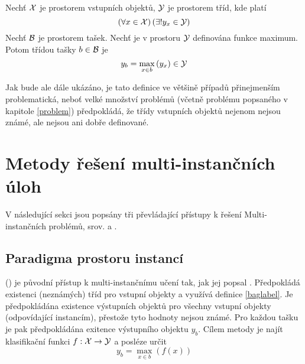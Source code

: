 \begin{define}\label{baglabel}
	Nechť \( \mathcal X \) je prostorem vstupních objektů, \( \mathcal Y \) je prostorem tříd, kde platí
	\[ \left( \forall x \in \mathcal X \right) \left( \exists ! y_x \in \mathcal Y \right) \]
	Nechť \( \mathcal B \) je prostorem tašek. Nechť je v prostoru \( \mathcal Y \) definována funkce maximum. Potom třídou tašky \( b \in \mathcal B \) je
	\[ y_b = \max_{x \in b} \left( y_x \right) \in \mathcal Y \]
\end{define}

Jak bude ale dále ukázáno, je tato definice ve většině případů přinejmenším problematická, neboť velké množství problémů (včetně problému popsaného v kapitole \ref{problem}) předpokládá, že třídy vstupních objektů nejenom nejsou známé, ale nejsou ani dobře definované.

\section{Metody řešení multi-instančních úloh}

V následující sekci jsou popsány tři převládající přístupy k řešení Multi-instančních problémů, srov. \cite{pevny_using_2016} a \cite{pevny_discriminative_2016}.

\subsection{Paradigma prostoru instancí}
() je původní přístup k multi-instančnímu učení tak, jak jej popsal \cite{dietterich_solving_1997}. Předpokládá existenci (neznámých) tříd pro vstupní objekty a využívá definice \ref{baglabel}.
Je předpokládána existence výstupních objektů pro všechny vstupní objekty (odpovídající instancím), přestože tyto hodnoty nejsou známé. Pro každou tašku je pak předpokládána exitence výstupního objektu \( y_b \). Cílem metody je najít klasifikační funkci \( f : \mathcal X \to \mathcal Y \) a posléze určit
\[ y_b = \max_{x \in b} \left( f \left( x \right) \right) \]

